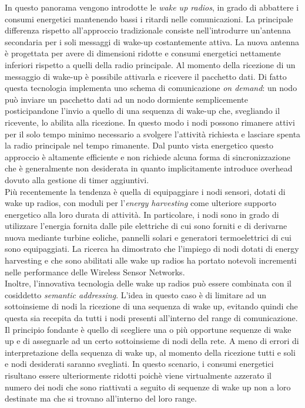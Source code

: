 \documentclass[binding=0.6cm,TFA]{sapthesis}
\begin{document}
In questo panorama vengono introdotte le \emph{wake up radios}, in grado di abbattere i consumi energetici mantenendo bassi i ritardi nelle comunicazioni.
La principale differenza rispetto all'approccio tradizionale consiste nell'introdurre un'antenna secondaria per i soli messaggi di wake-up costantemente
attiva. La nuova antenna è progettata per avere di dimensioni ridotte e consumi energetici nettamente inferiori rispetto a quelli della radio principale.
Al momento della ricezione di un messaggio di wake-up è possibile attivarla e ricevere il pacchetto dati. Di fatto questa tecnologia implementa uno schema
di comunicazione \emph{on demand}: un nodo può inviare un pacchetto dati ad un nodo dormiente semplicemente  posticipandone l'invio a quello di una sequenza
di wake-up che, svegliando il ricevente, lo abilita alla ricezione. In questo modo i nodi possono rimanere attivi per il solo tempo minimo necessario a
svolgere l'attività richiesta e lasciare spenta la radio principale nel tempo rimanente. Dal punto vista energetico questo approccio è altamente efficiente
e non richiede alcuna forma di sincronizzazione che è generalmente non desiderata in quanto implicitamente introduce overhead dovuto alla gestione di timer
aggiuntivi.\\

Più recentemente la tendenza è quella di equipaggiare i nodi sensori, dotati di wake up radios, con moduli per l'\emph{energy harvesting} come ulteriore
supporto energetico alla loro durata di attività. In particolare, i nodi sono in grado di utilizzare l'energia fornita dalle pile elettriche di cui sono
forniti e di derivarne nuova mediante turbine eoliche, pannelli solari e generatori termoelettrici di cui sono equipaggiati. La ricerca ha dimostrato che
l'impiego di nodi dotati di energy harvesting \cite{energy-harvesting-paper} e che sono abilitati alle wake up radios \cite{wake-up-radios-paper} ha
portato notevoli incrementi nelle performance delle Wireless Sensor Networks.\\

Inoltre, l'innovativa tecnologia delle wake up radios può essere combinata con il cosiddetto \emph{semantic addressing}. L'idea in questo caso è di limitare
ad un sottoinsieme di nodi la ricezione di una sequenza di wake up, evitando quindi che questa sia recepita da tutti i nodi presenti all'interno
del range di comunicazione. Il principio fondante è quello di scegliere una o più opportune sequenze di wake up e di assegnarle ad un certo
sottoinsieme di nodi della rete. A meno di errori di interpretazione della sequenza di wake up, al momento della ricezione tutti e soli e nodi desiderati
saranno svegliati. In questo scenario, i consumi energetici risultano essere ulteriormente ridotti poichè viene virtualmente azzerato il numero dei nodi
che sono riattivati a seguito di sequenze di wake up non a loro destinate ma che si trovano all'interno del loro range.\\
\end{document}
